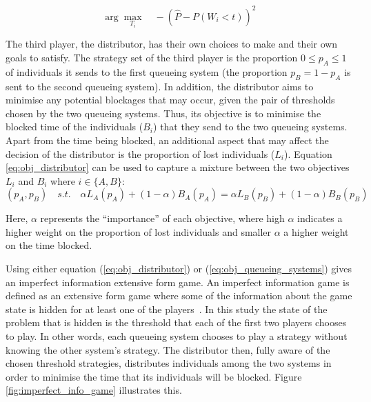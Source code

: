 \begin{equation}\label{eq:obj_queueing_systems}
    \arg \max_{T_i} \quad -\left( \hat{P} - P(W_i < t) \right)^2
\end{equation}


The third player, the distributor, has their own choices to make and their own 
goals to satisfy.
The strategy set of the third player is the proportion \(0 \leq p_A \leq 1\) of 
individuals it sends to the first queueing system (the proportion 
\(p_B = 1 - p_A\) is sent to the second queueing system).
In addition, the distributor aims to minimise any potential blockages
that may occur, given the pair of thresholds chosen by the two queueing systems.
Thus, its objective is to minimise the blocked time of the individuals (\(B_i\))
that they send to the two queueing systems.
Apart from the time being blocked, an additional aspect that may affect the 
decision of the distributor is the proportion of lost individuals (\(L_i\)).
Equation \ref{eq:obj_distributor} can be used to capture a mixture 
between the two objectives \(L_i\) and \(B_i\) where \(i \in \{A, B\}\):
\begin{equation*}\label{eq:obj_distributor}
    (p_A, p_B) \quad s.t. \quad 
    \alpha L_A(p_A) + (1 - \alpha) B_A(p_A) = 
    \alpha L_B(p_B) + (1 - \alpha) B_B(p_B)
\end{equation*}

Here, \(\alpha\) represents the ``importance'' of each objective,
where high \(\alpha\) indicates a higher weight on the proportion of lost 
individuals and smaller \(\alpha\) a higher weight on the time blocked. 

Using either equation (\ref{eq:obj_distributor}) or 
(\ref{eq:obj_queueing_systems}) gives an imperfect information extensive form 
game. 
An imperfect information game is defined as an extensive form game where some 
of the information about the game state is hidden for at least one of the 
players~\cite{Berwanger2008}. In this study the state of the problem that is
hidden is the threshold that each of the first two players chooses to play.
In other words, each queueing system chooses to play a strategy without 
knowing the other system's strategy.
The distributor then, fully aware of the chosen threshold strategies, 
distributes individuals among the two systems in order to minimise the time 
that its individuals will be blocked. Figure \ref{fig:imperfect_info_game} 
illustrates this. 

